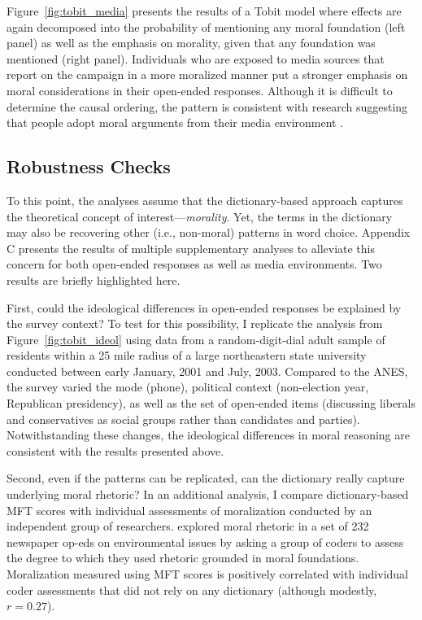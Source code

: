 Figure~\ref{fig:tobit_media} presents the results of a Tobit model where effects are again decomposed into the probability of mentioning any moral foundation (left panel) as well as the emphasis on morality, given that any foundation was mentioned (right panel). Individuals who are exposed to media sources that report on the campaign in a more moralized manner put a stronger emphasis on moral considerations in their open-ended responses. Although it is difficult to determine the causal ordering, the pattern is consistent with research suggesting that people adopt moral arguments from their media environment \citep[e.g.,][]{clifford2015concerns}. 


\subsection{Robustness Checks}

To this point, the analyses assume that the dictionary-based approach captures the theoretical concept of interest---\textit{morality}. Yet, the terms in the dictionary may also be recovering other (i.e., non-moral) patterns in word choice. Appendix C presents the results of multiple supplementary analyses to alleviate this concern for both open-ended responses as well as media environments. Two results are briefly highlighted here.

First, could the ideological differences in open-ended responses be explained by the survey context? To test for this possibility, I replicate the analysis from Figure~\ref{fig:tobit_ideol} using data from a random-digit-dial adult sample of residents within a 25 mile radius of a large northeastern state university conducted between early January, 2001 and July, 2003. Compared to the ANES, the survey varied the mode (phone), political context (non-election year, Republican presidency), as well as the set of open-ended items (discussing liberals and conservatives as social groups rather than candidates and parties). Notwithstanding these changes, the ideological differences in moral reasoning are consistent with the results presented above.

Second, even if the patterns can be replicated, can the dictionary really capture underlying moral rhetoric? In an additional analysis, I compare dictionary-based MFT scores with individual assessments of moralization conducted by an independent group of researchers. \citet{feinberg2013moral} explored moral rhetoric in a set of 232 newspaper op-eds on environmental issues by asking a group of coders to assess the degree to which they used rhetoric grounded in moral foundations. Moralization measured using MFT scores is positively correlated with individual coder assessments that did not rely on any dictionary (although modestly, $r=0.27$).


